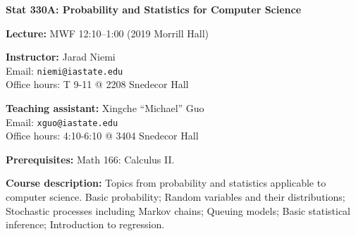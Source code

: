 \documentclass[10pt]{article}
\newcommand{\sep}{\vspace*{0.4cm}}
\newcommand{\tab}{\hspace*{0.8cm}}
\begin{document}
\pagestyle{fancy}

%



\begin{center}
\textbf{\large Stat 330A: Probability and Statistics for Computer Science}
\end{center}
\sep

\textbf{Lecture:} MWF 12:10--1:00 (2019 Morrill Hall)
\sep

\textbf{Instructor:} 
Jarad Niemi\\
\tab Email: {\tt niemi@iastate.edu}\\
\tab Office hours: T 9-11 @ 2208 Snedecor Hall
\sep

\textbf{Teaching assistant:}
Xingche ``Michael'' Guo\\
\tab Email: {\tt xguo@iastate.edu}\\
\tab Office hours: 4:10-6:10 @ 3404 Snedecor Hall
\sep

\textbf{Prerequisites:} Math 166: Calculus II. 
\sep

\textbf{Course description:}
Topics from probability and statistics applicable to computer science. 
Basic probability; Random variables and their distributions; 
Stochastic processes including Markov chains; Queuing models; 
Basic statistical inference; Introduction to regression.
\sep
\end{document}
